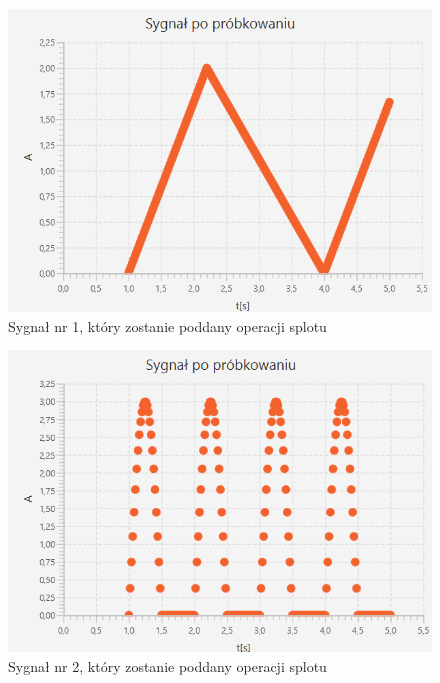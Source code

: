 \documentclass[12pt]{article}
\begin{document}
\begin{figure}[H]
    \centering
	\includegraphics[width=\linewidth]{sygnal_po_probkowaniu_2.2.png}
    \caption{Sygnał nr 1, który zostanie poddany operacji splotu}
    \label{Sygnał_7.1}
\end{figure}

\begin{figure}[H]
    \centering
	\includegraphics[width=\linewidth]{sygnal_po_probkowaniu_2.1.png}
    \caption{Sygnał nr 2, który zostanie poddany operacji splotu}
    \label{Sygnał_7.2}
\end{figure}
\end{document}
